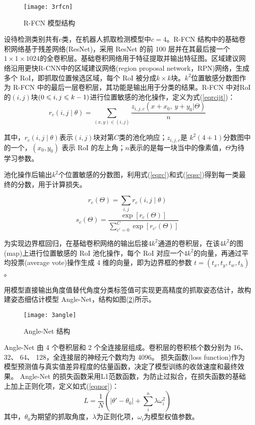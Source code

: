\documentclass[no-math, withoutpreface]{YangThesis}
\begin{document}
\begin{figure}[!htbp]
	\centering
	\texttt{[image: 3rfcn]}
	\caption{R-FCN 模型结构}
     \label{figrfcn}
\end{figure}

设待检测类别共有$c$类，在机器人抓取检测模型中$c = 4$。R-FCN 结构中的基础卷积网络基于残差网络(ResNet)\cite{bibb20}，采用 ResNet 的前 100 层并在其最后接一个$1\times1\times1024$的全卷积层。基础卷积网络用于特征提取并输出特征图。区域建议网络沿用更快R-CNN中的区域建议网络(region proposal network，RPN)\cite{bibb17}网络，生成多个 RoI，即抓取位置候选区域，每个 RoI 被分成$k\times k$块。$k^2$位置敏感分数图作为 R-FCN 中的最后一层卷积层，其功能是输出用于分类的结果。R-FCN 中对RoI 的$(i, j)$块$(0\leqslant i, j\leqslant k-1)$进行位置敏感的池化操作，定义为式(\ref{eqrcijt})：
\begin{equation}
r_c(i,j\mid\theta)=\sum_{(x,y)\in(i,j)}\frac{z_{i,j,c}(x+x_0,\ y+y_0|\Theta)}{n}
\label{eqrcijt}
\end{equation}

其中，$r_c(i,j\mid\theta)$表示$ (i, j) $块对第$ C $类的池化响应；$z_{i,j,c}$是 $k^2(4 + 1)$分数图中的一个，$(x_0, y_0)$ 表示 RoI 的左上角；$n$表示的是每一块当中的像素值，$\Theta$为待学习参数。

池化操作后输出$k^2$个位置敏感的分数图，利用式(\ref{eqrc})和式(\ref{eqsc})得到每一类最终的分数，用于计算损失。

\begin{equation}
r_c(\Theta)=\sum_{i,j}r_c(i,j\mid\theta)
\label{eqrc}
\end{equation}
\begin{equation}
s_c(\Theta)=\dfrac{\exp[{r_c(\Theta)}]}{\sum\limits_{c'=0}^C\exp[{r_{c'}(\Theta)}]}
\label{eqsc}
\end{equation}

为实现边界框回归，在基础卷积网络的输出后接$ 4k^2 $通道的卷积层，在该$ 4k^2 $的图(map)上进行位置敏感的 RoI 池化操作，每个 RoI 对应一个$ 4k^2 $的向量，再通过平均投票(average vote)操作生成 4 维的向量，即为边界框的参数
$ t = (t_x,t_y,t_w,t_h)$。

用模型直接输出角度值替代角度分类标签值可实现更高精度的抓取姿态估计，故构建姿态细估计模型 Angle-Net，结构如图(\ref{figangle})所示。

\begin{figure}[!htbp]
	\centering
	\texttt{[image: 3angle]}
	\caption{Angle-Net 结构}
     \label{figangle}
\end{figure}

Angle-Net 由 4 个卷积层和 2 个全连接层组成。卷积层的卷积核个数分别为 16、 32、 64、 128，全连接层的神经元个数均为 4096。 损失函数(loss function)作为模型预测值与真实值差异程度的估量函数，决定了模型训练的收敛速度和最终效果。 Angle-Net 的损失函数采用L1范数函数，为防止过拟合，在损失函数的基础上加上正则化项，定义如式(\ref{eqnor})：
\begin{equation}
L=\frac{1}{N}\left(\Big|\theta'-\theta_0\Big|+\sum\limits_i^n\lambda\omega_i^2\right)
\label{eqnor}
\end{equation}
其中，$\theta_0$为期望的抓取角度，$\lambda$为正则化项，$\omega_i$为模型权值参数。
\end{document}
